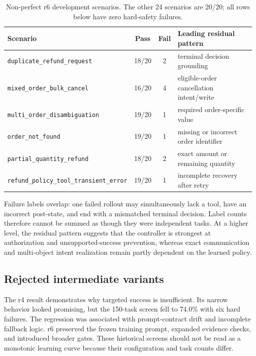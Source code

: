 \documentclass[11pt]{article}
\begin{document}
\begin{table}[t]
\centering
\caption{Non-perfect r6 development scenarios. The other 24 scenarios are 20/20; all rows below have zero hard-safety failures.}
\label{tab:residual}
\small
\begin{tabularx}{\textwidth}{@{}lccY@{}}
\toprule
Scenario & Pass & Fail & Leading residual pattern \\
\midrule
\texttt{duplicate\_refund\_request} & 18/20 & 2 & terminal decision grounding \\
\texttt{mixed\_order\_bulk\_cancel} & 16/20 & 4 & eligible-order cancellation intent/write \\
\texttt{multi\_order\_disambiguation} & 19/20 & 1 & required order-specific value \\
\texttt{order\_not\_found} & 19/20 & 1 & missing or incorrect order identifier \\
\texttt{partial\_quantity\_refund} & 18/20 & 2 & exact amount or remaining quantity \\
\texttt{refund\_policy\_tool\_transient\_error} & 19/20 & 1 & incomplete recovery after retry \\
\bottomrule
\end{tabularx}
\end{table}

Failure labels overlap: one failed rollout may simultaneously lack a tool, have an incorrect post-state, and end with a mismatched terminal decision. Label counts therefore cannot be summed as though they were independent tasks. At a higher level, the residual pattern suggests that the controller is strongest at authorization and unsupported-success prevention, whereas exact communication and multi-object intent realization remain partly dependent on the learned policy.

\subsection{Rejected intermediate variants}

The r4 result demonstrates why targeted success is insufficient. Its narrow behavior looked promising, but the 150-task screen fell to 74.0\% with six hard failures. The regression was associated with prompt-contract drift and incomplete fallback logic. r6 preserved the frozen training prompt, expanded evidence checks, and introduced broader gates. These historical screens should not be read as a monotonic learning curve because their configuration and task counts differ.
\end{document}
